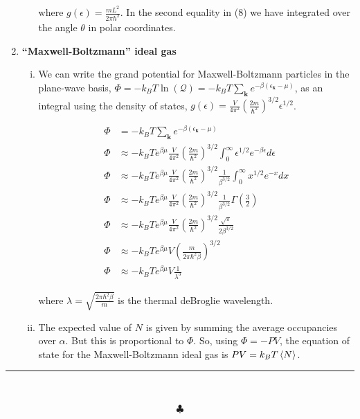 \documentclass[]{article}
\begin{document}
\begin{enumerate}[1.]
\begin{enumerate}[i.]
where $g(\epsilon) = \frac{mL^2}{2\pi\hbar^2}$. In the second equality in (8) we have integrated over the angle $\theta$ in polar coordinates. \\

\end{enumerate}

\item {\bf “Maxwell-Boltzmann” ideal gas}

\begin{enumerate}[i.]

\item We can write the grand potential for Maxwell-Boltzmann particles in the plane-wave basis, $\Phi = -k_BT\ln( \mathcal{Q} ) = -k_BT\sum_{\bm{k}} e^{-\beta(\epsilon_{\bm{k}} - \mu)}$, as an integral using the density of states, $g(\epsilon) = \frac{V}{4\pi^2}\left( \frac{2m}{\hbar^2}\right)^{3/2} \epsilon^{1/2}$. 

\begin{equation}
\begin{split}
\Phi & = -k_BT\sum_{\bm{k}} e^{-\beta(\epsilon_{\bm{k}} - \mu)} \\
\Phi & \approx -k_BT e^{\beta\mu} \frac{V}{4\pi^2} \left( \frac{2m}{\hbar^2} \right)^{3/2} \int_{0}^{\infty} \epsilon^{1/2} e^{-\beta\epsilon} d\epsilon \\
\Phi & \approx -k_BT e^{\beta\mu} \frac{V}{4\pi^2} \left( \frac{2m}{\hbar^2} \right)^{3/2} \frac{1}{\beta^{3/2}}\int_{0}^{\infty} x^{1/2} e^{-x} dx \\
\Phi & \approx -k_BT e^{\beta\mu} \frac{V}{4\pi^2} \left( \frac{2m}{\hbar^2} \right)^{3/2} \frac{1}{\beta^{3/2}}  \Gamma\left(\frac{3}{2} \right) \\
\Phi & \approx -k_BT e^{\beta\mu} \frac{V}{4\pi^2} \left( \frac{2m}{\hbar^2} \right)^{3/2} \frac{\sqrt{\pi}}{2\beta^{3/2}}  \\
\Phi & \approx -k_BT e^{\beta\mu} V \left( \frac{m}{2\pi\hbar^2\beta} \right)^{3/2} \\
\Phi & \approx -k_BT e^{\beta\mu} V \frac{1}{\lambda^3}
\end{split}
\end{equation}

where $\lambda = \sqrt{ \frac{2\pi\hbar^2\beta}{m}  }$ is the thermal deBroglie wavelength. \\

\item The expected value of $N$ is given by summing the average occupancies over $\alpha$. But this is proportional to $\Phi$. So, using $\Phi = - PV$,  the equation of state for the Maxwell-Boltzmann ideal gas is $PV = k_BT \expval{N}$. \\

\end{enumerate}


\end{enumerate}

\begin{center}
\noindent\rule{15cm}{0.4pt} \\
\end{center}
$$\clubsuit$$
\end{document}
